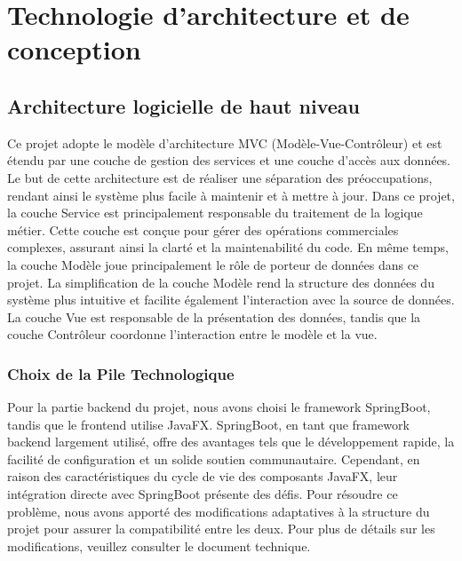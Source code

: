 \documentclass{article}
\begin{document}
\section{Technologie d'architecture et de conception}


\subsection{Architecture logicielle de haut niveau}

Ce projet adopte le modèle d'architecture MVC (Modèle-Vue-Contrôleur) et est étendu par une couche de gestion des services et une couche d'accès aux données. Le but de cette architecture est de réaliser une séparation des préoccupations, rendant ainsi le système plus facile à maintenir et à mettre à jour. Dans ce projet, la couche Service est principalement responsable du traitement de la logique métier. Cette couche est conçue pour gérer des opérations commerciales complexes, assurant ainsi la clarté et la maintenabilité du code. En même temps, la couche Modèle joue principalement le rôle de porteur de données dans ce projet. La simplification de la couche Modèle rend la structure des données du système plus intuitive et facilite également l'interaction avec la source de données. La couche Vue est responsable de la présentation des données, tandis que la couche Contrôleur coordonne l'interaction entre le modèle et la vue.
\subsubsection{Choix de la Pile Technologique}
Pour la partie backend du projet, nous avons choisi le framework SpringBoot, tandis que le frontend utilise JavaFX. SpringBoot, en tant que framework backend largement utilisé, offre des avantages tels que le développement rapide, la facilité de configuration et un solide soutien communautaire. Cependant, en raison des caractéristiques du cycle de vie des composants JavaFX, leur intégration directe avec SpringBoot présente des défis. Pour résoudre ce problème, nous avons apporté des modifications adaptatives à la structure du projet pour assurer la compatibilité entre les deux. Pour plus de détails sur les modifications, veuillez consulter le document technique.
\end{document}
